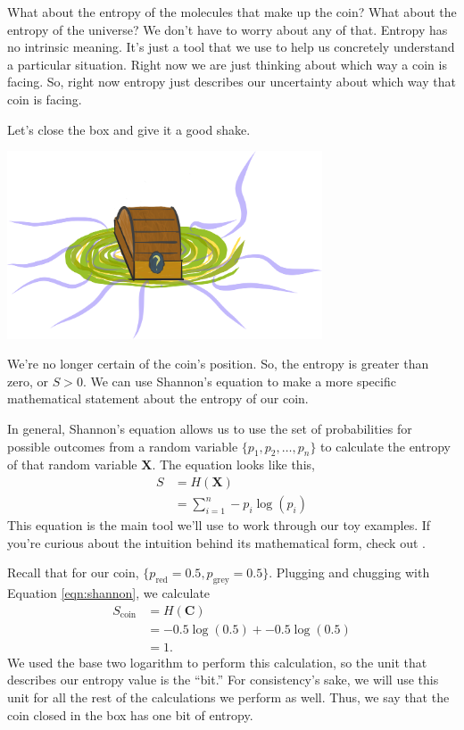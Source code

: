 What about the entropy of the molecules that make up the coin?
What about the entropy of the universe?
We don't have to worry about any of that.
Entropy has no intrinsic meaning.
It's just a tool that we use to help us concretely understand a particular situation.
Right now we are just thinking about which way a coin is facing.
So, right now entropy just describes our uncertainty about which way that coin is facing.

Let's close the box and give it a good shake.
\begin{center}
\includegraphics[width=0.7\textwidth]{img/big-box-closed-portal}
\end{center}
We're no longer certain of the coin's position.
So, the entropy is greater than zero, or $S > 0$.
We can use Shannon's equation to make a more specific mathematical statement about the entropy of our coin.

In general, Shannon's equation allows us to use the set of probabilities for possible outcomes from a random variable $\{p_1, p_2, \ldots, p_n\}$ to calculate the entropy of that random variable $\bm{X}$.
The equation looks like this,
\begin{align} \label{eqn:shannon}
S
&= H(\bm{X}) \\
&= \sum_{i=1}^{n} -p_i \log(p_i)
\end{align}
This equation is the main tool we'll use to work through our toy examples.
If you're curious about the intuition behind its mathematical form, check out \cite{Adami2016}.

Recall that for our coin, $\{p_{\text{red}} = 0.5, p_{\text{grey}} = 0.5 \}$.
Plugging and chugging with Equation \ref{eqn:shannon}, we calculate
\begin{align*}
S_{\text{coin}}
&= H(\bm{C}) \\
&= -0.5 \log(0.5) + -0.5 \log(0.5) \\
&= 1.
\end{align*}
We used the base two logarithm to perform this calculation, so the unit that describes our entropy value is the ``bit.''
For consistency's sake, we will use this unit for all the rest of the calculations we perform as well.
Thus, we say that the coin closed in the box has one bit of entropy.

